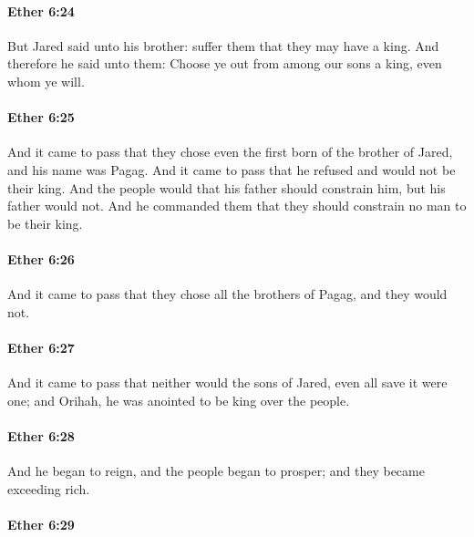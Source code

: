 		\paragraph{Ether 6:24} %
			\label{ETHER-6-24}

			But Jared said unto his brother:
			suffer them that they may have a king.
			And therefore he said unto them:
			Choose ye out from among our sons a king, even whom ye will.

		\paragraph{Ether 6:25} %
			\label{ETHER-6-25}

			And it came to pass that
			they chose even the first born of the brother of Jared,
			and his name was Pagag.
			And it came to pass that he refused and would not be their king.
			And the people would that his father should constrain him,
			but his father would not.
			And he commanded them
			that they should constrain no man to be their king.

		\paragraph{Ether 6:26} %
			\label{ETHER-6-26}

			And it came to pass that they chose all the brothers of Pagag,
			and they would not.

		\paragraph{Ether 6:27} %
			\label{ETHER-6-27}

			And it came to pass that neither would the sons of Jared,
			even all save it were one;
			and Orihah, he was anointed to be king over the people.

		\paragraph{Ether 6:28} %
			\label{ETHER-6-28}

			And he began to reign, and the people began to prosper;
			and they became exceeding rich.

		\paragraph{Ether 6:29} %
			\label{ETHER-6-29}

